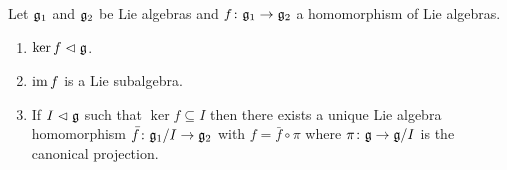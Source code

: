 \begin{prop}
 Let $\mathfrak{g}_1$ and $\mathfrak{g}_2$ be Lie algebras and $f \colon \mathfrak{g}_1 \to \mathfrak{g}_2$ a homomorphism of Lie algebras.
 \begin{enumerate}
  \item
   $\ker f \vartriangleleft \mathfrak{g}$.
  \item
   $\operatorname{im} f$ is a Lie subalgebra.
  \item
   If $I \vartriangleleft \mathfrak{g}$ such that $\ker f \subseteq I$ then there exists a unique Lie algebra homomorphism $\bar{f} \colon \mathfrak{g}_1/I \to \mathfrak{g}_2$ with $f = \bar{f} \circ \pi$ where $\pi \colon \mathfrak{g} \to \mathfrak{g}/I$ is the canonical projection.
   \begin{center}
   \end{center}
 \end{enumerate}
\end{prop}











































